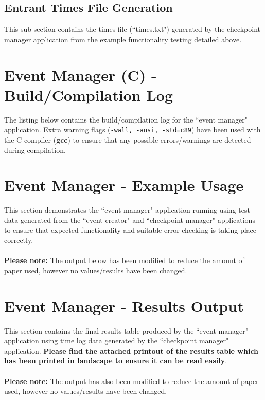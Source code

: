 \documentclass[a4paper, 10pt]{article}
\begin{document}
\clearpage
\subsection{Entrant Times File Generation}

This sub-section contains the times file (``times.txt") generated by the checkpoint manager application from the example functionality testing detailed above.



\clearpage
\section{Event Manager (C) - Build/Compilation Log}

The listing below contains the build/compilation log for the ``event manager" application. Extra warning flags (\verb+-wall, -ansi, -std=c89+) have been used with the C compiler (\textbf{gcc}) to ensure that any possible errors/warnings are detected during compilation. \\



\clearpage
\section{Event Manager - Example Usage}
This section demonstrates the ``event manager" application running using test data generated from the ``event creator" and ``checkpoint manager" applications to ensure that expected functionality and suitable error checking is taking place correctly.\\\\
\textbf{Please note:} The output below has been modified to reduce the amount of paper used, however no values/results have been changed.



\clearpage
\section{Event Manager - Results Output}
This section contains the final results table produced by the ``event manager" application using time log data generated by the ``checkpoint manager" application. \textbf{Please find the attached printout of the results table which has been printed in landscape to ensure it can be read easily}.\\\\
\textbf{Please note:} The output has also been modified to reduce the amount of paper used, however no values/results have been changed.
\end{document}
